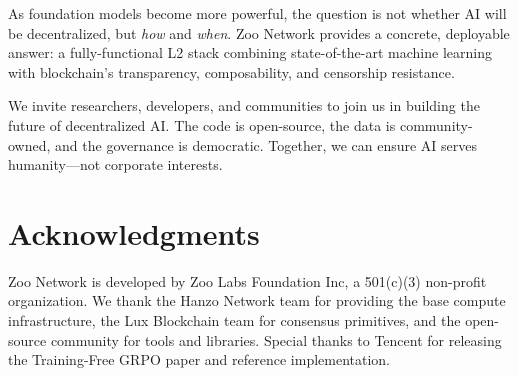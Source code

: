 \documentclass[11pt,a4paper]{article}
\begin{document}
As foundation models become more powerful, the question is not whether AI will be decentralized, but \textit{how} and \textit{when}. Zoo Network provides a concrete, deployable answer: a fully-functional L2 stack combining state-of-the-art machine learning with blockchain's transparency, composability, and censorship resistance.

We invite researchers, developers, and communities to join us in building the future of decentralized AI. The code is open-source, the data is community-owned, and the governance is democratic. Together, we can ensure AI serves humanity—not corporate interests.

\section*{Acknowledgments}

Zoo Network is developed by Zoo Labs Foundation Inc, a 501(c)(3) non-profit organization. We thank the Hanzo Network team for providing the base compute infrastructure, the Lux Blockchain team for consensus primitives, and the open-source community for tools and libraries. Special thanks to Tencent for releasing the Training-Free GRPO paper and reference implementation.
\end{document}
